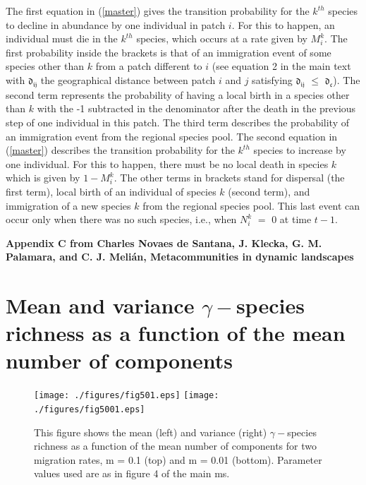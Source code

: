 \documentclass[12pt]{article}
\begin{document}
The first equation in (\ref{master}) gives the transition probability
for the $k^{th}$ species to decline in abundance by one individual in
patch $i$. For this to happen, an individual must die in the $k^{th}$
species, which occurs at a rate given by $M^{k}_{i}$. The first
probability inside the brackets is that of an immigration event of
some species other than $k$ from a patch different to $i$ (see
equation 2 in the main text with $\mathfrak{d_{ij}}$ the geographical
distance between patch $i$ and $j$ satisfying $\mathfrak{d_{ij}}$
$\leq$ $\mathfrak{d_{c}}$). The second term represents the probability
of having a local birth in a species other than $k$ with the -1
subtracted in the denominator after the death in the previous step of
one individual in this patch. The third term describes the probability
of an immigration event from the regional species pool. The second
equation in (\ref{master}) describes the transition probability for
the $k^{th}$ species to increase by one individual. For this to
happen, there must be no local death in species $k$ which is given by
$1 - M^{k}_{i}$. The other terms in brackets stand for dispersal (the
first term), local birth of an individual of species $k$ (second
term), and immigration of a new species $k$ from the regional species
pool. This last event can occur only when there was no such species,
i.e., when $N_{i}^{k}$ $=$ 0 at time $t - 1$.  

\clearpage
\begin{flushleft} 
{\Large \textbf{Appendix C from Charles Novaes de Santana, J. Klecka, G. M. Palamara, and C. J. Meli\'{a}n, Metacommunities in dynamic landscapes}}
\section*{Mean and variance $\gamma-$species richness as a function of the mean number of components}
\end{flushleft}
\renewcommand{\theequation}{C-\arabic{equation}}
\setcounter{equation}{0}
\renewcommand{\thesection}{C\arabic{section}}
\renewcommand{\thefigure}{C\arabic{figure}}
\renewcommand{\thetable}{C\arabic{table}}
\setcounter{figure}{0}
\setcounter{table}{0}

\begin{figure}[hb!]
\texttt{[image: ./figures/fig501.eps]}
\hspace{-2 in}\texttt{[image: ./figures/fig5001.eps]}
\caption{This figure shows the mean (left) and variance (right) $\gamma-$species richness as a function of the mean number of components for two migration rates, m = 0.1 (top) and m = 0.01 (bottom). Parameter values used are as in figure 4 of the main ms.}
\label{fig:SI-C1}
\end{figure}
\end{document}
